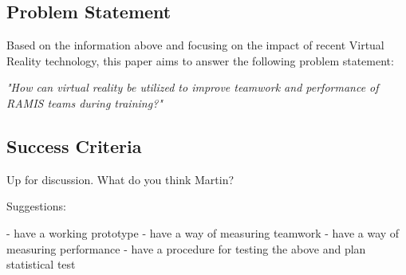 \documentclass[paper=a4, fontsize=11pt]{scrartcl} %
\numberwithin{equation}{section} %
\numberwithin{figure}{section} %
\numberwithin{table}{section} %
\begin{document}

\subsection{Problem Statement}

Based on the information above and focusing on the impact of recent Virtual Reality technology, this paper aims to answer the following problem statement:\\

\begin{center}
\emph{\textit{"How can virtual reality be utilized to improve teamwork and performance of RAMIS  teams during training?"}}
\end{center}


\subsection{Success Criteria}

Up for discussion. What do you think Martin? 

Suggestions: 

- have a working prototype
- have a way of measuring teamwork
- have a way of measuring performance
- have a procedure for testing the above and plan statistical test

\end{document}
